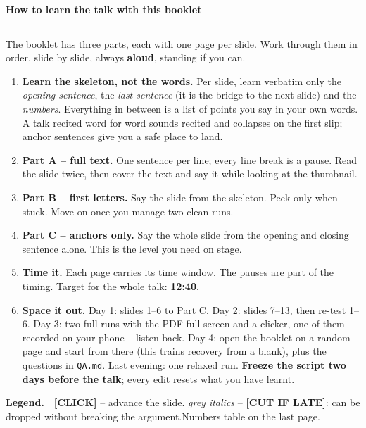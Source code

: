 \documentclass[11pt,a4paper]{article}
\begin{document}
{\color{ctublue}\LARGE\bfseries How to learn the talk with this booklet}

{\color{ctublue}\rule{\textwidth}{1pt}}

\medskip
The booklet has three parts, each with one page per slide. Work through them in order,
slide by slide, always \textbf{aloud}, standing if you can.

\begin{enumerate}[leftmargin=*,itemsep=4pt]
  \item \textbf{Learn the skeleton, not the words.} Per slide, learn verbatim only the
        \emph{opening sentence}, the \emph{last sentence} (it is the bridge to the next
        slide) and the \emph{numbers}. Everything in between is a list of points you say
        in your own words. A talk recited word for word sounds recited and collapses on
        the first slip; anchor sentences give you a safe place to land.
  \item \textbf{Part A -- full text.} One sentence per line; every line break is a pause.
        Read the slide twice, then cover the text and say it while looking at the thumbnail.
  \item \textbf{Part B -- first letters.} Say the slide from the skeleton. Peek only when
        stuck. Move on once you manage two clean runs.
  \item \textbf{Part C -- anchors only.} Say the whole slide from the opening and closing
        sentence alone. This is the level you need on stage.
  \item \textbf{Time it.} Each page carries its time window. The pauses are part of the
        timing. Target for the whole talk: \textbf{12:40}.
  \item \textbf{Space it out.} Day 1: slides 1--6 to Part C. Day 2: slides 7--13, then re-test
        1--6. Day 3: two full runs with the PDF full-screen and a clicker, one of them recorded
        on your phone -- listen back. Day 4: open the booklet on a random page and start
        from there (this trains recovery from a blank), plus the questions in \texttt{QA.md}.
        Last evening: one relaxed run. \textbf{Freeze the script two days before the talk};
        every edit resets what you have learnt.
\end{enumerate}

\medskip
\textbf{Legend.}\ \ {\color{accent}\bfseries [CLICK]} -- advance the slide.\quad
{\color{ink!55}\itshape grey italics} -- \textbf{[CUT IF LATE]}: can be dropped without
breaking the argument.\quad Numbers table on the last page.
\newpage
\end{document}
